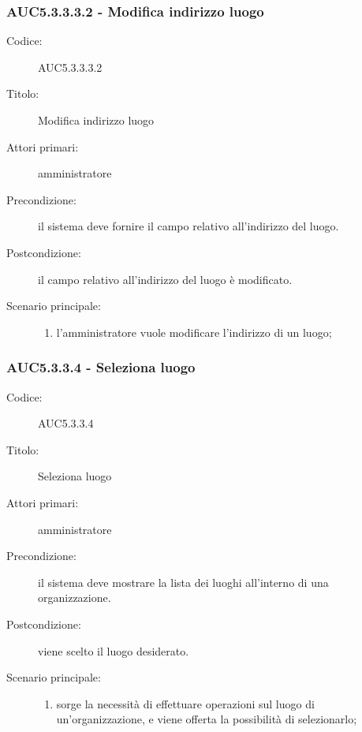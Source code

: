 \documentclass[../../../analisi-dei-requisiti.tex]{subfiles}
\begin{document}
\subsubsection{AUC5.3.3.3.2 - Modifica indirizzo luogo}%
\label{subs:AUC5.3.3.3.2}
\begin{description}
  \item[Codice:] AUC5.3.3.3.2
  \item[Titolo:] Modifica indirizzo luogo
  \item[Attori primari:] amministratore
  \item[Precondizione:] il sistema deve fornire il campo relativo all'indirizzo del luogo.
  \item[Postcondizione:] il campo relativo all'indirizzo del luogo è modificato.
  \item[Scenario principale:]
  \begin{enumerate}
    \item l'amministratore vuole modificare l'indirizzo di un luogo;
  \end{enumerate}
\end{description}

\subsubsection{AUC5.3.3.4 - Seleziona luogo}%
\label{subs:AUC5.3.3.4}
\begin{description}
  \item[Codice:] AUC5.3.3.4
  \item[Titolo:] Seleziona luogo
  \item[Attori primari:] amministratore
  \item[Precondizione:] il sistema deve mostrare la lista dei luoghi all'interno di una organizzazione.
  \item[Postcondizione:] viene scelto il luogo desiderato.
  \item[Scenario principale:]
  \begin{enumerate}
    \item sorge la necessità di effettuare operazioni sul luogo di un'organizzazione, e viene offerta la possibilità di selezionarlo;
  \end{enumerate}
\end{description}
\end{document}
